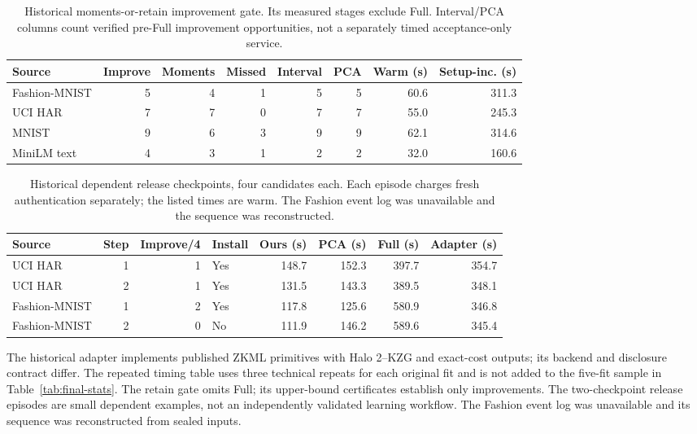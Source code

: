 \documentclass[5p,times,twocolumn]{elsarticle}
\begin{document}
\begin{table}[H]
\centering\small
\caption{Historical moments-or-retain improvement gate. Its measured stages exclude Full. Interval/PCA columns count verified pre-Full improvement opportunities, not a separately timed acceptance-only service.}
\label{tab:retain-gate}
\begin{tabular}{@{}lrrrrrrr@{}}
\toprule
Source & Improve & Moments & Missed & Interval & PCA & Warm (s) & Setup-inc. (s)\\
\midrule
Fashion-MNIST & 5 & 4 & 1 & 5 & 5 & 60.6 & 311.3\\
UCI HAR & 7 & 7 & 0 & 7 & 7 & 55.0 & 245.3\\
MNIST & 9 & 6 & 3 & 9 & 9 & 62.1 & 314.6\\
MiniLM text & 4 & 3 & 1 & 2 & 2 & 32.0 & 160.6\\
\bottomrule
\end{tabular}
\end{table}

\begin{table}[H]
\centering\small
\caption{Historical dependent release checkpoints, four candidates each. Each episode charges fresh authentication separately; the listed times are warm. The Fashion event log was unavailable and the sequence was reconstructed.}
\label{tab:revision-proof-workflow}
\begin{tabular}{@{}lrrlrrrr@{}}
\toprule
Source & Step & Improve/4 & Install & Ours (s) & PCA (s) & Full (s) & Adapter (s)\\
\midrule
UCI HAR & 1 & 1 & Yes & 148.7 & 152.3 & 397.7 & 354.7\\
UCI HAR & 2 & 1 & Yes & 131.5 & 143.3 & 389.5 & 348.1\\
Fashion-MNIST & 1 & 2 & Yes & 117.8 & 125.6 & 580.9 & 346.8\\
Fashion-MNIST & 2 & 0 & No & 111.9 & 146.2 & 589.6 & 345.4\\
\bottomrule
\end{tabular}
\end{table}

The historical adapter implements published ZKML primitives with
Halo 2--KZG and exact-cost outputs; its backend and disclosure contract
differ. The repeated timing table uses three technical repeats for each
original fit and is not added to the five-fit sample in
Table~\ref{tab:final-stats}. The retain gate omits Full; its upper-bound
certificates establish only improvements. The two-checkpoint release
episodes are small dependent examples, not an independently validated
learning workflow. The Fashion event log was unavailable and its
sequence was reconstructed from sealed inputs.
\end{document}
